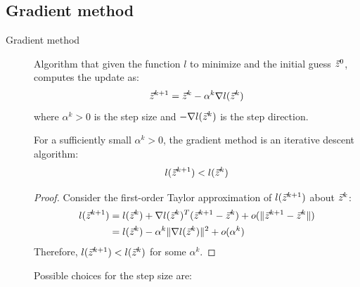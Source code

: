 \subsection{Gradient method}

\begin{description}
    \item[Gradient method] 
        Algorithm that given the function $l$ to minimize and the initial guess ${\vec{z}}^0$, computes the update as:
        \[ {\vec{z}}^{k+1} = {\vec{z}}^k - \alpha^k \nabla l({\vec{z}}^k) \]
        where $\alpha^k > 0$ is the step size and $- \nabla l({\vec{z}}^k)$ is the step direction.

        \begin{theorem}
            For a sufficiently small $\alpha^k > 0$, the gradient method is an iterative descent algorithm:
            \[ l({\vec{z}}^{k+1}) < l({\vec{z}}^{k}) \]

            \begin{proof}
                Consider the first-order Taylor approximation of $l({\vec{z}}^{k+1})$ about ${\vec{z}}^k$:
                \[
                    \begin{split}
                        l({\vec{z}}^{k+1}) &= l({\vec{z}}^k) + \nabla l({\vec{z}}^k)^T ({\vec{z}}^{k+1} - {\vec{z}}^k) + o(\Vert {\vec{z}}^{k+1} - {\vec{z}}^k \Vert) \\
                        &= l({\vec{z}}^k) - \alpha^k \Vert \nabla l({\vec{z}}^k)\Vert^2 + o(\alpha^k)
                    \end{split}
                \]
                Therefore, $l({\vec{z}}^{k+1}) < l({\vec{z}}^{k})$ for some $\alpha^k$.
            \end{proof}
        \end{theorem}

        \begin{remark} 
            Possible choices for the step size are:
\end{remark}
\end{description}
